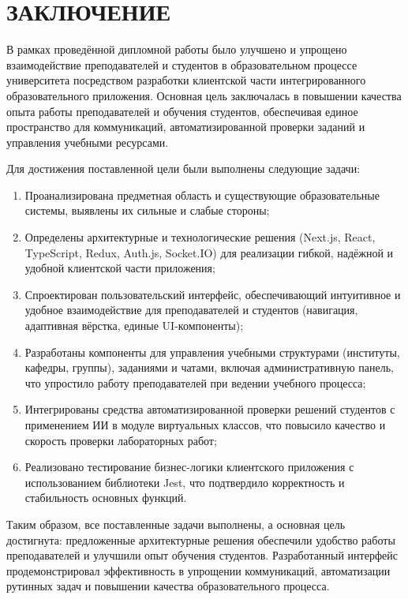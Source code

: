 \newpage
{}
\section*{ЗАКЛЮЧЕНИЕ}

В рамках проведённой дипломной работы было улучшено и упрощено взаимодействие преподавателей и студентов в образовательном процессе университета посредством разработки клиентской части интегрированного образовательного приложения. Основная цель заключалась в повышении качества опыта работы преподавателей и обучения студентов, обеспечивая единое пространство для коммуникаций, автоматизированной проверки заданий и управления учебными ресурсами.

Для достижения поставленной цели были выполнены следующие задачи:
\begin{enumerate}
  \item Проанализирована предметная область и существующие образовательные системы, выявлены их сильные и слабые стороны;
  \item Определены архитектурные и технологические решения (Next.js, React, TypeScript, Redux, Auth.js, Socket.IO) для реализации гибкой, надёжной и удобной клиентской части приложения;
  \item Спроектирован пользовательский интерфейс, обеспечивающий интуитивное и удобное взаимодействие для преподавателей и студентов (навигация, адаптивная вёрстка, единые UI-компоненты);
  \item Разработаны компоненты для управления учебными структурами (институты, кафедры, группы), заданиями и чатами, включая административную панель, что упростило работу преподавателей при ведении учебного процесса;
  \item Интегрированы средства автоматизированной проверки решений студентов с применением ИИ в модуле виртуальных классов, что повысило качество и скорость проверки лабораторных работ;
  \item Реализовано тестирование бизнес-логики клиентского приложения с использованием библиотеки Jest, что подтвердило корректность и стабильность основных функций.
\end{enumerate}

Таким образом, все поставленные задачи выполнены, а основная цель достигнута: предложенные архитектурные решения обеспечили удобство работы преподавателей и улучшили опыт обучения студентов. Разработанный интерфейс продемонстрировал эффективность в упрощении коммуникаций, автоматизации рутинных задач и повышении качества образовательного процесса.

